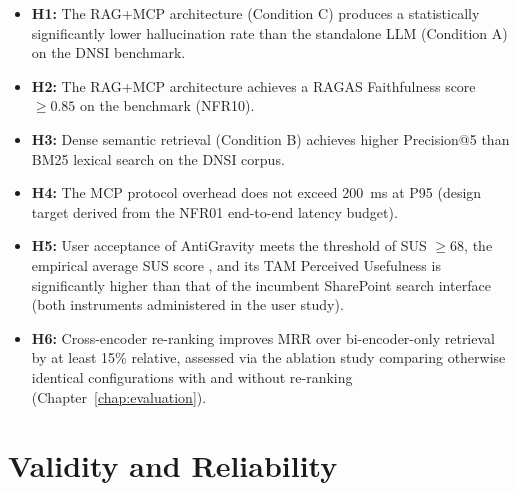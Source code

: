 \begin{itemize}
\item \textbf{H1:} The RAG+MCP architecture (Condition C) produces a statistically significantly lower hallucination rate than the standalone LLM (Condition A) on the DNSI benchmark.
\item \textbf{H2:} The RAG+MCP architecture achieves a RAGAS Faithfulness score $\geq 0.85$ on the benchmark (NFR10).
\item \textbf{H3:} Dense semantic retrieval (Condition B) achieves higher Precision@5 than BM25 lexical search on the DNSI corpus.
\item \textbf{H4:} The MCP protocol overhead does not exceed 200~ms at P95 (design target derived from the NFR01 end-to-end latency budget).
\item \textbf{H5:} User acceptance of AntiGravity meets the threshold of SUS $\geq 68$, the empirical average SUS score \citep{Sauro2011SUS, Bangor2009SUSAdjective}, and its TAM Perceived Usefulness is significantly higher than that of the incumbent SharePoint search interface (both instruments administered in the user study).
\item \textbf{H6:} Cross-encoder re-ranking improves MRR over bi-encoder-only retrieval by at least 15\% relative, assessed via the ablation study comparing otherwise identical configurations with and without re-ranking (Chapter~\ref{chap:evaluation}).
\end{itemize}

\section{Validity and Reliability}
\label{sec:method-validity}

